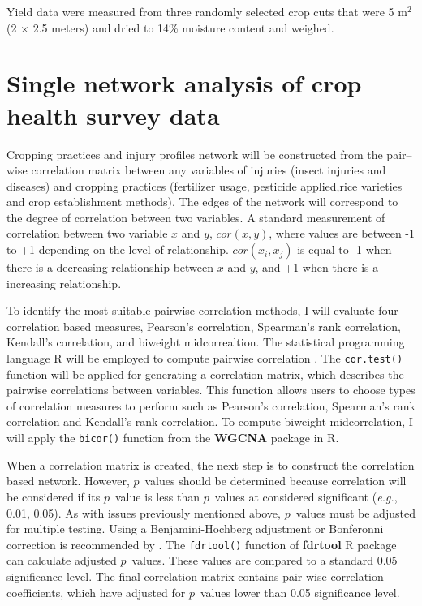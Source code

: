 Yield data were measured from three randomly selected crop cuts that were 5 $\mathrm{m}^{2}$ (2 $\times$ 2.5 meters) and dried to 14\% moisture content and weighed.

\section*{Single network analysis of crop health survey data}

Cropping practices and injury profiles network will be constructed from the pair--wise correlation matrix between any variables of injuries (insect injuries and diseases) and cropping practices (fertilizer usage, pesticide applied,rice varieties and crop establishment methods). The edges of the network will correspond to the degree of correlation between two variables. A standard measurement of correlation between two variable $x$ and $y$, $cor(x,y)$, where values are  between -1 to +1 depending on the level of relationship. $cor(x_{i}, x_{j})$ is equal to -1 when there is a decreasing relationship between $x$ and $y$, and +1 when there is a increasing relationship.

To identify the most suitable pairwise correlation methods, I will evaluate four correlation based measures, Pearson's correlation, Spearman's rank correlation, Kendall's correlation, and biweight midcorrealtion. The statistical programming language \textsf{R} will be employed to compute pairwise correlation . The \texttt{cor.test()} function will be applied for generating a correlation matrix, which describes the pairwise correlations between variables. This function allows users to choose types of correlation measures to perform such as Pearson's correlation, Spearman's rank correlation and Kendall's rank correlation. To compute biweight midcorrelation, I will apply the \texttt{bicor()} function from the \textbf{WGCNA} package  in \textsf{R}. 

When a correlation matrix is created, the next step is to construct the correlation based network. However, $p$~values should be determined because correlation will be considered if    its $p$~value is less than $p$~values at considered significant (\textit{e.g.}, 0.01, 0.05). As with issues previously mentioned above, $p$~values must be adjusted for multiple testing. Using a Benjamini-Hochberg adjustment or Bonferonni correction is recommended by . The \texttt{fdrtool()} function of \textbf{fdrtool} R package can calculate adjusted $p$~values. These values are compared to a standard 0.05 significance level. The final correlation matrix contains pair-wise correlation coefficients, which have adjusted for $p$~values lower than 0.05 significance level.

